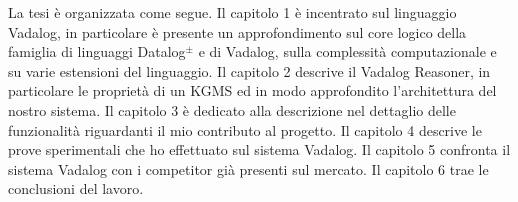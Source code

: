 La tesi è organizzata come segue. \newline \newline
Il capitolo 1 è incentrato sul linguaggio Vadalog, in particolare è presente un approfondimento sul core logico della famiglia di linguaggi Datalog$^\pm$ e di Vadalog, sulla complessità computazionale e su varie estensioni del linguaggio. \newline 
Il capitolo 2 descrive il Vadalog Reasoner, in particolare le proprietà di un KGMS ed in modo approfondito l'architettura del nostro sistema. \newline 
Il capitolo 3 è dedicato alla descrizione nel dettaglio delle funzionalità riguardanti il mio contributo al progetto. \newline 
Il capitolo 4 descrive le prove sperimentali che ho effettuato sul sistema Vadalog. \newline 
Il capitolo 5 confronta il sistema Vadalog con i competitor già presenti sul mercato. \newline 
Il capitolo 6 trae le conclusioni del lavoro.
